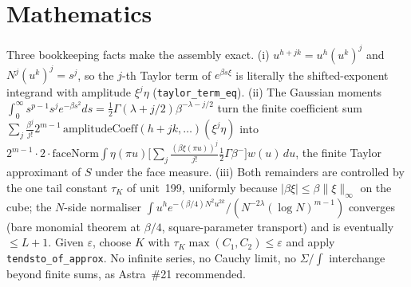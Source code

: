 \documentclass[11pt]{article}
\begin{document}
\section{Mathematics}
Three bookkeeping facts make the assembly exact. (i) $u^{h+jk}=u^h(u^k)^j$ and $N^j(u^k)^j=s^j$, so the
$j$-th Taylor term of $e^{\beta s\xi}$ is literally the shifted-exponent integrand with amplitude
$\xi^j\eta$ (\texttt{taylor\_term\_eq}). (ii) The Gaussian moments
$\int_0^\infty s^{p-1}s^je^{-\beta s^2}ds=\tfrac12\Gamma(\lambda+j/2)\beta^{-\lambda-j/2}$ turn the
finite coefficient sum $\sum_j\frac{\beta^j}{j!}2^{m-1}\,\mathrm{amplitudeCoeff}(h+jk,\dots)(\xi^j\eta)$
into $2^{m-1}\cdot2\cdot\mathrm{faceNorm}\int\eta(\pi u)\bigl[\sum_j\frac{(\beta\xi(\pi u))^j}{j!}\tfrac12\Gamma\beta^{-}\bigr]w(u)\,du$,
the finite Taylor approximant of $S$ under the face measure. (iii) Both remainders are controlled
by the one tail constant $\tau_K$ of unit~199, uniformly because $|\beta\xi|\le\beta\|\xi\|_\infty$
on the cube; the $N$-side normaliser $\int u^he^{-(\beta/4)N^2u^{2k}}/(N^{-2\lambda}(\log N)^{m-1})$
converges (bare monomial theorem at $\beta/4$, square-parameter transport) and is eventually
$\le L+1$. Given $\varepsilon$, choose $K$ with $\tau_K\max(C_1,C_2)\le\varepsilon$ and apply
\texttt{tendsto\_of\_approx}. No infinite series, no Cauchy limit, no $\Sigma/\!\int$ interchange
beyond finite sums, as Astra~\#21 recommended.
\end{document}
